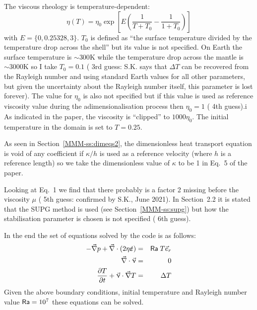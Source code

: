 The viscous rheology is temperature-dependent:
\[
\eta(T) =\eta_0 \exp\left[ E \left( \frac{1}{T+T_0} -\frac{1}{1+T_0}  \right)   \right]
\]
with $E= \{0,0.25328,3\}$. $T_0$ is defined as ``the surface temperature divided by the temperature
drop across the shell'' but its value is not specified. On Earth the surface temperature 
is $\sim300\si{\kelvin}$
while the temperature drop across the mantle is $\sim3000\si{\kelvin}$ 
so I take $T_0=0.1$ ({\color{orange} 3rd guess}: S.K. says that $\Delta T$ can be recovered from 
the Rayleigh number and using standard Earth values for all other parameters, but given the uncertainty about 
the Rayleigh number itself, this parameter is lost forever).
The value for $\eta_0$ is also not specified but if this value is used as reference viscosity value 
during the adimensionalisation process then $\eta_0=1$ ({\color{orange} 4th guess}).i
As indicated in the paper, the viscosity is ``clipped'' to $1000\eta_0$.
The initial temperature in the domain is set to $T=0.25$.

As seen in Section~\ref{MMM-ss:dimeqs2}, the dimensionless heat transport equation 
is void of any coefficient if $\kappa/h$ is used as a reference velocity 
(where $h$ is a reference length) so we take the 
dimensionless value of $\kappa$ to be 1 in Eq.~5 of the paper.   

Looking at Eq.~1 we find that there probably is a factor 2 missing before 
the viscosity $\mu$ ({\color{orange} 5th guess}: confirmed by S.K., June 2021).
In Section~2.2 it is stated that the SUPG method is used (see Section~\ref{MMM-ss:supg}) 
but how the stabilisation parameter
is chosen is not specified ({\color{orange} 6th guess}).

In the end the set of equations solved by the code is as follows:
\begin{eqnarray}
-\vec\nabla p + \vec\nabla \cdot(2 \eta \dot{\bm \varepsilon} ) &=& {\mathsf{Ra}} \; T \vec{e}_r \\
\vec\nabla\cdot\vec\upnu &=& 0 \\
\frac{\partial T}{\partial t} + \vec\upnu\cdot\vec\nabla T &=& \Delta T 
\end{eqnarray}
Given the above boundary conditions, initial temperature and Rayleigh number value ${\mathsf{Ra}}=10^7$ these
equations can be solved. 

